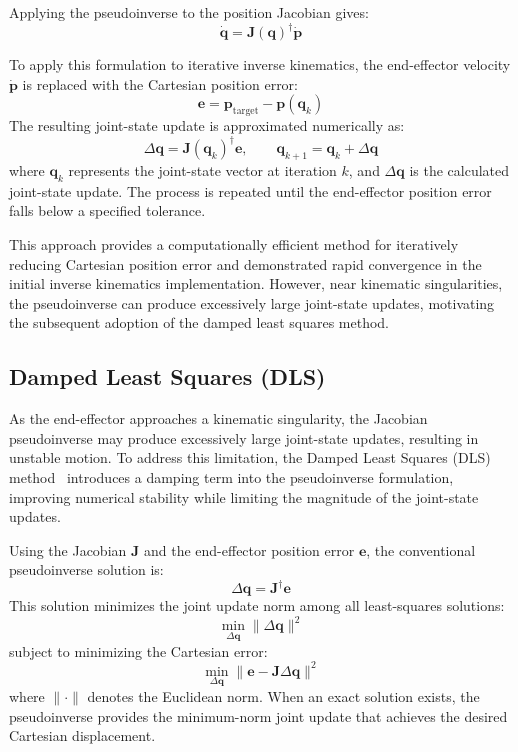 \documentclass[12pt,a4paper]{article}
\begin{document}
Applying the pseudoinverse to the position Jacobian gives:
\begin{equation}
    \dot{\mathbf{q}}
    = \mathbf{J}(\mathbf{q})^{\dagger}\dot{\mathbf{p}}
\end{equation}

To apply this formulation to iterative inverse kinematics, the
end-effector velocity $\dot{\mathbf{p}}$ is replaced with the
Cartesian position error:
\begin{equation}
    \mathbf{e} =
    \mathbf{p}_{\mathrm{target}} -
    \mathbf{p}(\mathbf{q}_k)
\end{equation}
The resulting joint-state update is approximated numerically as:
\begin{equation}
    \Delta\mathbf{q}
    = \mathbf{J}(\mathbf{q}_k)^{\dagger}\mathbf{e},
    \qquad
    \mathbf{q}_{k+1}
    = \mathbf{q}_k + \Delta\mathbf{q}
\end{equation}
where $\mathbf{q}_k$ represents the joint-state vector at iteration
$k$, and $\Delta\mathbf{q}$ is the calculated joint-state update.
The process is repeated until the end-effector position error
falls below a specified tolerance.

This approach provides a computationally efficient method for
iteratively reducing Cartesian position error and demonstrated
rapid convergence in the initial inverse kinematics implementation.
However, near kinematic singularities, the pseudoinverse can
produce excessively large joint-state updates, motivating the subsequent adoption of the damped least squares method.
\newpage


\subsection*{Damped Least Squares (DLS)}
As the end-effector approaches a kinematic singularity, the
Jacobian pseudoinverse may produce excessively large joint-state
updates, resulting in unstable motion. To address this limitation,
the Damped Least Squares (DLS) method~\cite{buss2009} introduces a damping term
into the pseudoinverse formulation, improving numerical stability
while limiting the magnitude of the joint-state updates.

Using the Jacobian $\mathbf{J}$ and the end-effector position error
$\mathbf{e}$, the conventional pseudoinverse solution is:
\begin{equation}
    \Delta\mathbf{q} = \mathbf{J}^{\dagger}\mathbf{e}
\end{equation}
This solution minimizes the joint update norm among all
least-squares solutions:
\begin{equation}
    \min_{\Delta\mathbf{q}} \|\Delta\mathbf{q}\|^2
\end{equation}
subject to minimizing the Cartesian error:
\begin{equation}
    \min_{\Delta\mathbf{q}}
    \|\mathbf{e}-\mathbf{J}\Delta\mathbf{q}\|^2
\end{equation}
where $\|\cdot\|$ denotes the Euclidean norm. When an exact
solution exists, the pseudoinverse provides the minimum-norm
joint update that achieves the desired Cartesian displacement.
\end{document}
